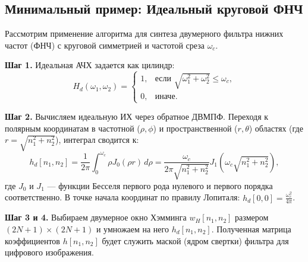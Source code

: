 \documentclass[12pt, a4paper]{article}
\theoremstyle{definition}
\theoremstyle{plain}
\begin{document}
\subsection{Минимальный пример: Идеальный круговой ФНЧ}

Рассмотрим применение алгоритма для синтеза двумерного фильтра нижних частот (ФНЧ) с круговой симметрией и частотой среза $\omega_c$.

\textbf{Шаг 1.} Идеальная АЧХ задается как цилиндр:
\begin{equation}
    H_d(\omega_1, \omega_2) =
    \begin{cases}
      1, & \text{если } \sqrt{\omega_1^2 + \omega_2^2} \leq \omega_c, \\
      0, & \text{иначе}.
   \end{cases}
\end{equation}

\textbf{Шаг 2.} Вычисляем идеальную ИХ через обратное ДВМПФ. Переходя к полярным координатам в частотной ($\rho, \phi$) и пространственной ($r, \theta$) областях (где $r = \sqrt{n_1^2 + n_2^2}$), интеграл сводится к:
\begin{equation}
    h_d[n_1, n_2] = \frac{1}{2\pi} \int_0^{\omega_c} \rho J_0(\rho r) \, d\rho = \frac{\omega_c}{2\pi \sqrt{n_1^2 + n_2^2}} J_1 \left(\omega_c \sqrt{n_1^2 + n_2^2}\right),
\end{equation}
где $J_0$ и $J_1$ — функции Бесселя первого рода нулевого и первого порядка соответственно. В точке начала координат по правилу Лопиталя: $h_d[0, 0] = \frac{\omega_c^2}{4\pi}$.

\textbf{Шаг 3 и 4.} Выбираем двумерное окно Хэмминга $w_H[n_1, n_2]$ размером $(2N+1) \times (2N+1)$ и умножаем на него $h_d[n_1, n_2]$. Полученная матрица коэффициентов $h[n_1, n_2]$ будет служить маской (ядром свертки) фильтра для цифрового изображения.
\end{document}
